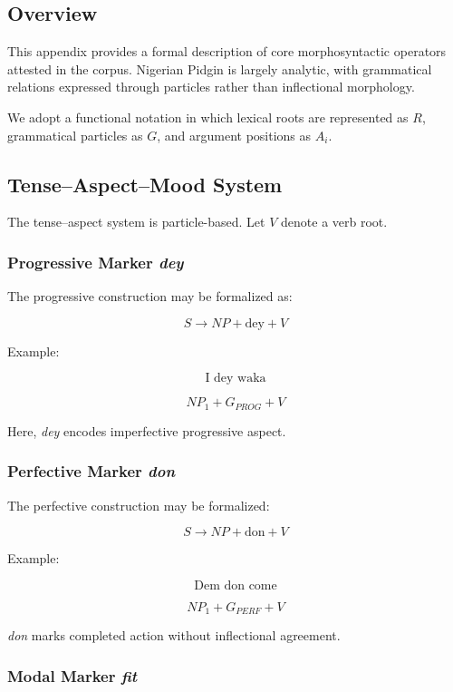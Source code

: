 \documentclass[12pt]{article}
\begin{document}
\subsection{Overview}

This appendix provides a formal description of core morphosyntactic operators attested in the corpus. Nigerian Pidgin is largely analytic, with grammatical relations expressed through particles rather than inflectional morphology.

We adopt a functional notation in which lexical roots are represented as \( R \), grammatical particles as \( G \), and argument positions as \( A_i \).

\subsection{Tense–Aspect–Mood System}

The tense–aspect system is particle-based. Let \( V \) denote a verb root.

\subsubsection*{Progressive Marker \textit{dey}}

The progressive construction may be formalized as:

\[
S \rightarrow NP + \text{dey} + V
\]

Example:

\[
\text{I dey waka}
\]

\[
NP_1 + G_{PROG} + V
\]

Here, \textit{dey} encodes imperfective progressive aspect.

\subsubsection*{Perfective Marker \textit{don}}

The perfective construction may be formalized:

\[
S \rightarrow NP + \text{don} + V
\]

Example:

\[
\text{Dem don come}
\]

\[
NP_1 + G_{PERF} + V
\]

\textit{don} marks completed action without inflectional agreement.

\subsubsection*{Modal Marker \textit{fit}}
\end{document}
